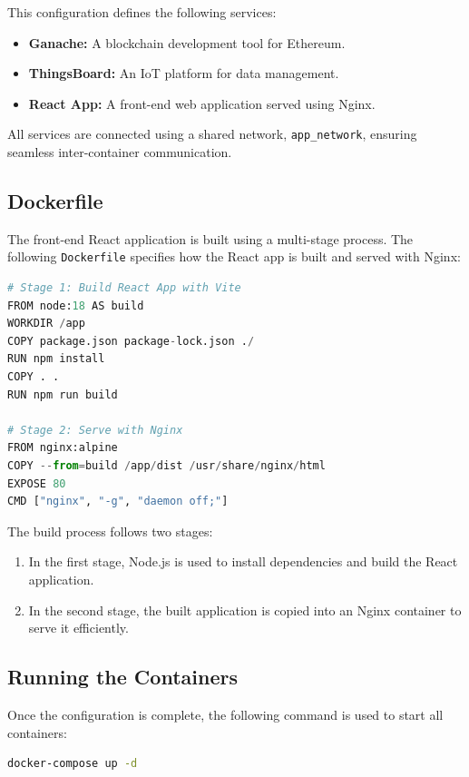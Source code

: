 \documentclass[a4paper,12pt]{report}
\begin{document}
\noindent
This configuration defines the following services:
\begin{itemize}
    \item \textbf{Ganache:} A blockchain development tool for Ethereum.
    \item \textbf{ThingsBoard:} An IoT platform for data management.
    \item \textbf{React App:} A front-end web application served using Nginx.
\end{itemize}

All services are connected using a shared network, \texttt{app\_network}, ensuring seamless inter-container communication.

\subsection{Dockerfile}

The front-end React application is built using a multi-stage process. The following \texttt{Dockerfile} specifies how the React app is built and served with Nginx:

\begin{lstlisting}[language=python]
# Stage 1: Build React App with Vite
FROM node:18 AS build
WORKDIR /app
COPY package.json package-lock.json ./
RUN npm install
COPY . . 
RUN npm run build

# Stage 2: Serve with Nginx
FROM nginx:alpine
COPY --from=build /app/dist /usr/share/nginx/html
EXPOSE 80
CMD ["nginx", "-g", "daemon off;"]
\end{lstlisting}

\noindent
The build process follows two stages:
\begin{enumerate}
    \item In the first stage, Node.js is used to install dependencies and build the React application.
    \item In the second stage, the built application is copied into an Nginx container to serve it efficiently.
\end{enumerate}

\subsection{Running the Containers}

Once the configuration is complete, the following command is used to start all containers:

\begin{lstlisting}[language=bash]
docker-compose up -d
\end{lstlisting}
\end{document}
